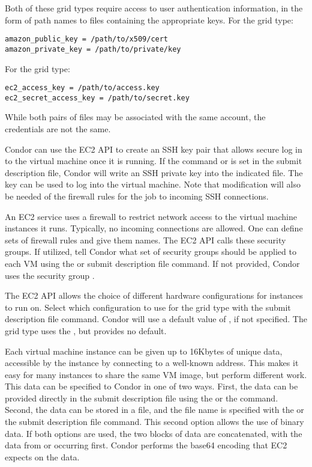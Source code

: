 Both of these grid types require access to user authentication information,
in the form of path names to files containing the appropriate keys.
For the  grid type:
\begin{verbatim}
amazon_public_key = /path/to/x509/cert
amazon_private_key = /path/to/private/key
\end{verbatim}

For the  grid type:
\begin{verbatim}
ec2_access_key = /path/to/access.key
ec2_secret_access_key = /path/to/secret.key
\end{verbatim}

While both pairs of files may be associated with the same account, 
the credentials are not the same.

Condor can use the EC2 API to create an SSH key pair that allows
secure log in to the virtual machine once it is running.
If the command
or 
is set in the submit description file,
Condor will write an SSH private key into the indicated file.
The key can be used to log into the virtual machine.
Note that modification will also be needed of the firewall
rules for the job to incoming SSH connections.

An EC2 service uses a firewall to restrict network access to 
the virtual machine instances it runs.
Typically, no incoming connections are allowed.
One can define sets of firewall rules and give them names.
The EC2 API calls these security groups. 
If utilized, tell Condor what set of security
groups should be applied to each VM using the
or  submit description file command.
If not provided, Condor uses the security group .

The EC2 API allows the choice of different hardware configurations 
for instances to run on.
Select which configuration to use for the  grid type
with the  submit description file command.
Condor will use a default value of
, if not specified.
The  grid type uses the , 
but provides no default.

Each virtual machine instance can be given up to 16Kbytes of unique data, 
accessible by the instance by connecting to a well-known address.
This makes it easy for many instances to share the same VM image,
but perform different work.
This data can be specified to Condor in one of two ways.
First, the data can be provided directly in the submit description file 
using the  
or the  command.
Second, the data can be
stored in a file, and the file name is specified with the
or the  submit description file command.
This second option allows the use of binary data.
If both options are used, the two blocks of
data are concatenated, with the data from 
or  occurring first.
Condor performs the base64 encoding that EC2 expects on the data.

